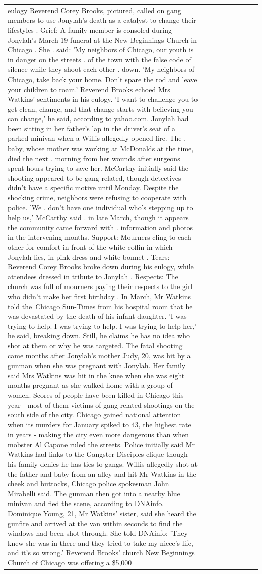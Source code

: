 \begin{table}[H]
\begin{tabular}{lllrlllll}
eulogy Reverend Corey Brooks, pictured, called on gang members to use Jonylah's death as a catalyst to change their lifestyles . Grief: A family member is consoled during Jonylah's March 19 funeral at the New Beginnings Church in Chicago . She . said: 'My neighbors of Chicago, our youth is in danger on the streets . of the town with the false code of silence while they shoot each other . down. 'My neighbors of Chicago, take back your home. Don't spare the rod and leave your children to roam.' Reverend Brooks echoed Mrs Watkins' sentiments in his eulogy. 'I want to challenge you to get clean, change, and that change starts with believing you can change,' he said, according to yahoo.com. Jonylah had been sitting in her father's lap in the driver's seat of a parked minivan when a Willis allegedly opened fire. The . baby, whose mother was working at McDonalds at the time, died the next . morning from her wounds after surgeons spent hours trying to save her. McCarthy initially said the shooting appeared to be gang-related, though detectives didn't have a specific motive until Monday. Despite the shocking crime, neighbors were refusing to cooperate with police. 'We . don't have one individual who's stepping up to help us,' McCarthy said . in late March, though it appears the community came forward with . information and photos in the intervening months. Support: Mourners cling to each other for comfort in front of the white coffin in which Jonylah lies, in pink dress and white bonnet . Tears: Reverend Corey Brooks broke down during his eulogy, while attendees dressed in tribute to Jonylah . Respects: The church was full of mourners paying their respects to the girl who didn't make her first birthday . In March, Mr Watkins told the Chicago Sun-Times from his hospital room that he was devastated by the death of his infant daughter. 'I was trying to help. I was trying to help. I was trying to help her,' he said, breaking down. Still, he claims he has no idea who shot at them or why he was targeted. The fatal shooting came months after Jonylah's mother Judy, 20, was hit by a gunman when she was pregnant with Jonylah. Her family said Mrs Watkins was hit in the knee when she was eight months pregnant as she walked home with a group of women. Scores of people have been killed in Chicago this year - most of them victims of gang-related shootings on the south side of the city. Chicago gained national attention when its murders for January spiked to 43, the highest rate in years - making the city even more dangerous than when mobster Al Capone ruled the streets. Police initially said Mr Watkins had links to the Gangster Disciples clique though his family denies he has ties to gangs. Willis allegedly shot at the father and baby from an alley and hit Mr Watkins in the cheek and buttocks, Chicago police spokesman John Mirabelli said. The gunman then got into a nearby blue minivan and fled the scene, according to DNAinfo. Dominique Young, 21, Mr Watkins' sister, said she heard the gunfire and arrived at the van within seconds to find the windows had been shot through. She told DNAinfo: 'They knew she was in there and they tried to take my niece's life, and it's so wrong.' Reverend Brooks' church New Beginnings Church of Chicago was offering a \$5,000 
\end{tabular}
\end{table}
